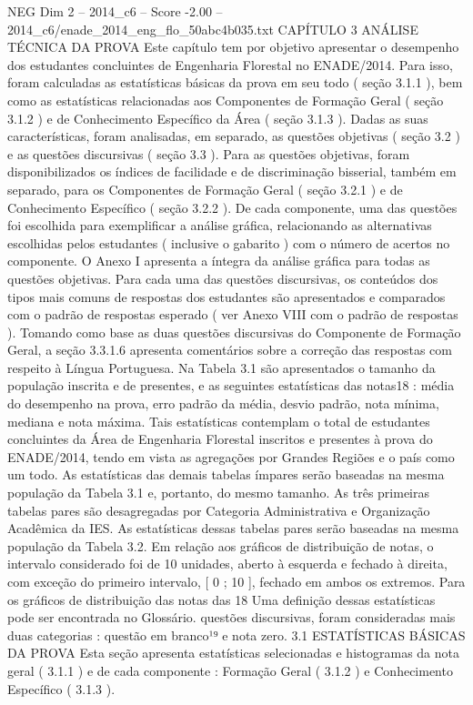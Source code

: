 \begin{textsample}{NEG Dim 2 – 2014\_c6 – Score -2.00 – 2014\_c6/enade\_2014\_eng\_flo\_50abc4b035.txt}  \label{ex:f2_neg_204}
CAPÍTULO 3 ANÁLISE TÉCNICA DA PROVA Este capítulo tem por objetivo apresentar o desempenho dos estudantes concluintes de Engenharia Florestal no ENADE/2014.
Para isso, foram calculadas as estatísticas básicas da prova em seu todo ( seção 3.1.1 ), bem como as estatísticas relacionadas aos Componentes de Formação Geral ( seção 3.1.2 ) e de Conhecimento Específico da Área ( seção 3.1.3 ).
Dadas as suas características, foram analisadas, em separado, as questões objetivas ( seção 3.2 ) e as questões discursivas ( seção 3.3 ).
Para as questões objetivas, foram disponibilizados os índices de facilidade e de discriminação bisserial, também em separado, para os Componentes de Formação Geral ( seção 3.2.1 ) e de Conhecimento Específico ( seção 3.2.2 ).
De cada componente, uma das questões foi escolhida para exemplificar a análise gráfica, relacionando as alternativas escolhidas pelos estudantes ( inclusive o gabarito ) com o número de acertos no componente.
O Anexo I apresenta a íntegra da análise gráfica para todas as questões objetivas.
Para cada uma das questões discursivas, os conteúdos dos tipos mais comuns de respostas dos estudantes são apresentados e comparados com o padrão de respostas esperado ( ver Anexo VIII com o padrão de respostas ).
Tomando como base as duas questões discursivas do Componente de Formação Geral, a seção 3.3.1.6 apresenta comentários sobre a correção das respostas com respeito à Língua Portuguesa.
Na Tabela 3.1 são apresentados o tamanho da população inscrita e de presentes, e as seguintes estatísticas das notas18 : média do desempenho na prova, erro padrão da média, desvio padrão, nota mínima, mediana e nota máxima.
Tais estatísticas contemplam o total de estudantes concluintes da Área de Engenharia Florestal inscritos e presentes à prova do ENADE/2014, tendo em vista as agregações por Grandes Regiões e o país como um todo.
As estatísticas das demais tabelas ímpares serão baseadas na mesma população da Tabela 3.1 e, portanto, do mesmo tamanho.
As três primeiras tabelas pares são desagregadas por Categoria Administrativa e Organização Acadêmica da IES.
As estatísticas dessas tabelas pares serão baseadas na mesma população da Tabela 3.2.
Em relação aos gráficos de distribuição de notas, o intervalo considerado foi de 10 unidades, aberto à esquerda e fechado à direita, com exceção do primeiro intervalo, [ 0 ; 10 ], fechado em ambos os extremos.
Para os gráficos de distribuição das notas das 18 Uma definição dessas estatísticas pode ser encontrada no Glossário. questões discursivas, foram consideradas mais duas categorias : questão em branco¹⁹ e nota zero. 3.1 ESTATÍSTICAS BÁSICAS DA PROVA Esta seção apresenta estatísticas selecionadas e histogramas da nota geral ( 3.1.1 ) e de cada componente : Formação Geral ( 3.1.2 ) e Conhecimento Específico ( 3.1.3 ).

\end{textsample}
